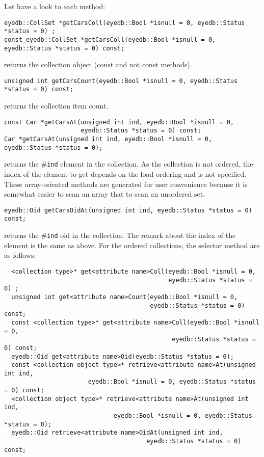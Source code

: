 \normalsize
Let have a look to each method:
\be
\item
\verbsize
\begin{verbatim}
eyedb::CollSet *getCarsColl(eyedb::Bool *isnull = 0, eyedb::Status *status = 0) ;
const eyedb::CollSet *getCarsColl(eyedb::Bool *isnull = 0, eyedb::Status *status = 0) const;
\end{verbatim}
\normalsize
returns the collection object (const and not const methods).
\item
\verbsize
\begin{verbatim}
unsigned int getCarsCount(eyedb::Bool *isnull = 0, eyedb::Status *status = 0) const;
\end{verbatim}
\normalsize
returns the collection item count.
\verbsize
\item
\verbsize
\begin{verbatim}
const Car *getCarsAt(unsigned int ind, eyedb::Bool *isnull = 0,
                     eyedb::Status *status = 0) const;
Car *getCarsAt(unsigned int ind, eyedb::Bool *isnull = 0, eyedb::Status *status = 0);
\end{verbatim}
\normalsize
returns the \#\texttt{ind} element in the collection. As the collection
is not ordered, the index of the element to get depends on the
load ordering and is not specified. These array-oriented methods
are generated for user convenience because it is somewhat easier to
scan an array that to scan an unordered set.
\item
\verbsize
\begin{verbatim}
eyedb::Oid getCarsOidAt(unsigned int ind, eyedb::Status *status = 0) const;
\end{verbatim}
\normalsize
returns the \#\texttt{ind} oid in the collection.
The remark about the index of the element is the same as above.
\ee
For the ordered collections, the selector method are as follows:
\verbsize
\begin{verbatim}
  <collection type>* get<attribute name>Coll(eyedb::Bool *isnull = 0,
                                             eyedb::Status *status = 0) ;
  unsigned int get<attribute name>Count(eyedb::Bool *isnull = 0,
                                        eyedb::Status *status = 0) const;
  const <collection type>* get<attribute name>Coll(eyedb::Bool *isnull = 0,
                                              eyedb::Status *status = 0) const;
  eyedb::Oid get<attribute name>Oid(eyedb::Status *status = 0);
  const <collection object type>* retrieve<attribute name>At(unsigned int ind,
                       eyedb::Bool *isnull = 0, eyedb::Status *status = 0) const;
  <collection object type>* retrieve<attribute name>At(unsigned int ind,
                              eyedb::Bool *isnull = 0, eyedb::Status *status = 0);
  eyedb::Oid retrieve<attribute name>OidAt(unsigned int ind,
                                       eyedb::Status *status = 0) const;
\end{verbatim}
